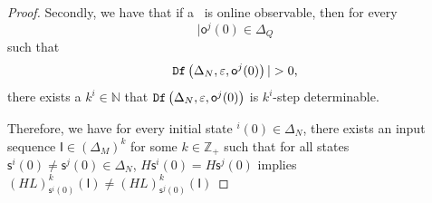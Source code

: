 \begin{proof}
Secondly, we have that if a \BCN\ is online observable,
then for every  \[|\mathsf{o}^{j}(0)\in \Delta_Q\] such that \[\Ded\left(\Delta_N,\varepsilon, \mathsf{o}^{j}(0)\right)|> 0,\] there exists a $k^{i}\in \mathbb{N}$ that ${\tt Df}\left(\Delta_N,\varepsilon,\mathsf{o}^{j}(0)\right)$ is $k^{i}$-step determinable. 

Therefore, we have for every initial state \State$^{i}(0)$$\in \Delta_N$, there exists an input sequence $\mathsf{I}\in(\Delta_M)^k$ for some $k\in \mathbb{Z}_+$ such that for all states $\mathsf{s}^{i}(0)\neq \mathsf{s}^{j}(0)\in \Delta_N$, $H\mathsf{s}^{i}(0)=H\mathsf{s}^{j}(0)$ implies $(HL)^k_{\mathsf{s}^{i}(0)}(\mathsf{I})\neq (HL)^k_{{\mathsf{s}^{j}(0)}}(\mathsf{I})$

\end{proof}

